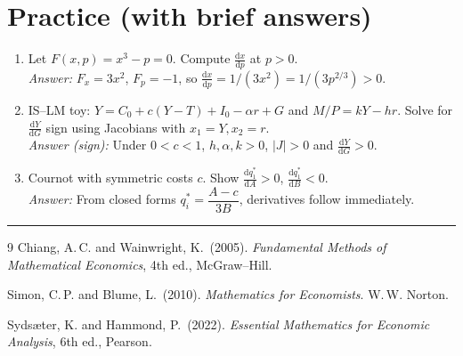 \documentclass[11pt]{article}
\newcommand{\dtotal}[2]{\frac{\mathrm{d} #1}{\mathrm{d} #2}}
\begin{document}
\section*{Practice (with brief answers)}
\begin{enumerate}[label=\arabic*.]
\item Let \(F(x,p)=x^3-p=0\). Compute \(\dtotal{x}{p}\) at \(p>0\). \\
\emph{Answer:} \(F_x=3x^2\), \(F_p=-1\), so \(\dtotal{x}{p}=1/(3x^2)=1/(3p^{2/3})>0\).

\item IS--LM toy: \(Y=C_0+c(Y-T)+I_0-\alpha r+G\) and \(M/P=kY-hr\). Solve for \(\dtotal{Y}{G}\) sign using Jacobians with \(x_1=Y,x_2=r\).\\
\emph{Answer (sign):} Under \(0<c<1\), \(h,\alpha,k>0\), \(|J|>0\) and \(\dtotal{Y}{G}>0\).

\item Cournot with symmetric costs \(c\). Show \(\dtotal{q_1^\ast}{A}>0\), \(\dtotal{q_1^\ast}{B}<0\). \\
\emph{Answer:} From closed forms \(q_i^\ast=\dfrac{A-c}{3B}\), derivatives follow immediately.
\end{enumerate}

\bigskip
\hrule
\bigskip


\bigskip

\begin{thebibliography}{9}
Chiang, A.\,C. and Wainwright, K.\ (2005). \emph{Fundamental Methods of Mathematical Economics}, 4th ed., McGraw--Hill.

Simon, C.\,P. and Blume, L.\ (2010). \emph{Mathematics for Economists}. W.\,W. Norton.

Syds\ae ter, K. and Hammond, P.\ (2022). \emph{Essential Mathematics for Economic Analysis}, 6th ed., Pearson.
\end{thebibliography}
\end{document}
